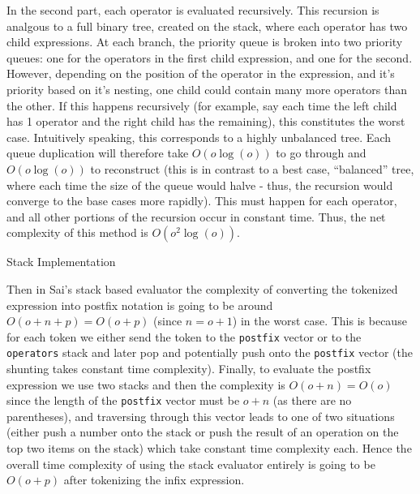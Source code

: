 \documentclass[11pt]{article}
\begin{document}
In the second part, each operator is evaluated recursively.
This recursion is analgous to a full binary tree, created on the stack, where each operator has two child expressions.
At each branch, the priority queue is broken into two priority queues: one for the operators in the first child expression, and one for the second.
However, depending on the position of the operator in the expression, and it's priority based on it's nesting, one child could contain many more operators than the other.
If this happens recursively (for example, say each time the left child has 1 operator and the right child has the remaining), this constitutes the worst case.
Intuitively speaking, this corresponds to a highly unbalanced tree.
Each queue duplication will therefore take $O(o\log(o))$ to go through and $O(o\log(o))$ to reconstruct (this is in contrast to a best case, ``balanced'' tree, where each time the size of the queue would halve - thus, the recursion would converge to the base cases more rapidly).
This must happen for each operator, and all other portions of the recursion occur in constant time.
Thus, the net complexity of this method is $O(o^2\log(o))$.

\centerline{Stack Implementation}
Then in Sai's stack based evaluator the complexity of converting the tokenized expression into postfix notation is going to be around $O(o+n+p) = O(o+p)$ (since $n=o+1$) in the worst case.
This is because for each token we either send the token to the \texttt{postfix} vector or to the \texttt{operators} stack and later pop and potentially push onto the \texttt{postfix} vector (the shunting takes constant time complexity).
Finally, to evaluate the postfix expression we use two stacks and then the complexity is $O(o+n) = O(o)$ since the length of the \texttt{postfix} vector must be $o+n$ (as there are no parentheses), and traversing through this vector leads to one of two situations (either push a number onto the stack or push the result of an operation on the top two items on the stack) which take constant time complexity each.
Hence the overall time complexity of using the stack evaluator entirely is going to be $O(o+p)$ after tokenizing the infix expression.
\end{document}
